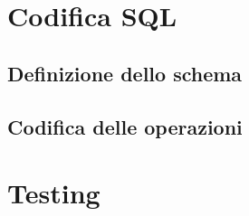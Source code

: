 \documentclass{article}
\begin{document}
\section{Codifica SQL}

\subsection{Definizione dello schema}

\subsection{Codifica delle operazioni}

\section{Testing}
\end{document}
